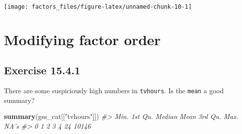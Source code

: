 \documentclass[]{book}
\newenvironment{Shaded}{\begin{snugshade}}{\end{snugshade}}
\newcommand{\CommentTok}[1]{\textcolor[rgb]{0.56,0.35,0.01}{\textit{#1}}}
\newcommand{\DataTypeTok}[1]{\textcolor[rgb]{0.13,0.29,0.53}{#1}}
\newcommand{\DecValTok}[1]{\textcolor[rgb]{0.00,0.00,0.81}{#1}}
\newcommand{\KeywordTok}[1]{\textcolor[rgb]{0.13,0.29,0.53}{\textbf{#1}}}
\newcommand{\NormalTok}[1]{#1}
\newcommand{\OperatorTok}[1]{\textcolor[rgb]{0.81,0.36,0.00}{\textbf{#1}}}
\newcommand{\StringTok}[1]{\textcolor[rgb]{0.31,0.60,0.02}{#1}}
\theoremstyle{plain}
\theoremstyle{remark}
\theoremstyle{definition}
\theoremstyle{definition}
\theoremstyle{definition}
\theoremstyle{remark}
\begin{document}
\begin{Shaded}
\end{Shaded}

\begin{center}\texttt{[image: factors\_files/figure-latex/unnamed-chunk-10-1]} \end{center}

\hypertarget{modifying-factor-order}{%
\section{Modifying factor order}\label{modifying-factor-order}}

\hypertarget{exercise-15.4.1}{%
\subsection*{\texorpdfstring{Exercise
{15.4.1}}{Exercise 15.4.1}}\label{exercise-15.4.1}}

There are some suspiciously high numbers in \texttt{tvhours}. Is the
\texttt{mean} a good summary?

\begin{Shaded}
\begin{Highlighting}[]
\KeywordTok{summary}\NormalTok{(gss_cat[[}\StringTok{"tvhours"}\NormalTok{]])}
\CommentTok{#>    Min. 1st Qu.  Median    Mean 3rd Qu.    Max.    NA's }
\CommentTok{#>       0       1       2       3       4      24   10146}
\end{Highlighting}
\end{Shaded}

\begin{Shaded}
\end{Shaded}
\end{document}
